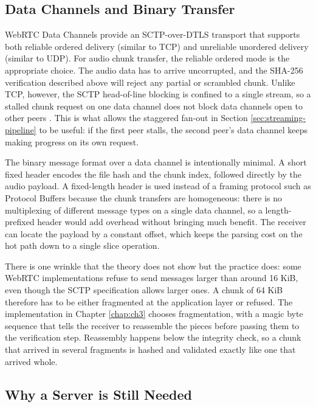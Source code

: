 \subsection{Data Channels and Binary Transfer}
\label{subsec:data-channels}

\indent \par WebRTC Data Channels provide an SCTP-over-DTLS transport that supports both reliable ordered delivery (similar to TCP) and unreliable unordered delivery (similar to UDP). For audio chunk transfer, the reliable ordered mode is the appropriate choice. The audio data has to arrive uncorrupted, and the SHA-256 verification described above will reject any partial or scrambled chunk. Unlike TCP, however, the SCTP head-of-line blocking is confined to a single stream, so a stalled chunk request on one data channel does not block data channels open to other peers \cite{webrtc_testing}. This is what allows the staggered fan-out in Section \ref{sec:streaming-pipeline} to be useful: if the first peer stalls, the second peer's data channel keeps making progress on its own request.

\par The binary message format over a data channel is intentionally minimal. A short fixed header encodes the file hash and the chunk index, followed directly by the audio payload. A fixed-length header is used instead of a framing protocol such as Protocol Buffers because the chunk transfers are homogeneous: there is no multiplexing of different message types on a single data channel, so a length-prefixed header would add overhead without bringing much benefit. The receiver can locate the payload by a constant offset, which keeps the parsing cost on the hot path down to a single slice operation.

\par There is one wrinkle that the theory does not show but the practice does: some WebRTC implementations refuse to send messages larger than around 16 KiB, even though the SCTP specification allows larger ones. A chunk of 64 KiB therefore has to be either fragmented at the application layer or refused. The implementation in Chapter \ref{chap:ch3} chooses fragmentation, with a magic byte sequence that tells the receiver to reassemble the pieces before passing them to the verification step. Reassembly happens below the integrity check, so a chunk that arrived in several fragments is hashed and validated exactly like one that arrived whole.

\subsection{Why a Server is Still Needed}
\label{subsec:signaling-role}


